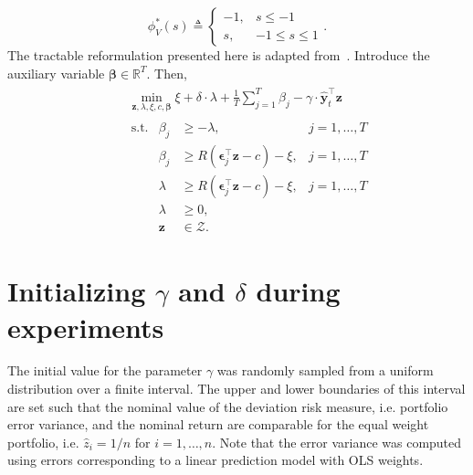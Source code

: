 \documentclass[10pt, twocolumn]{article}
\theoremstyle{plain}
\theoremstyle{definition}
\begin{document}
\begin{appendices}
\[
	\phi_V^*(s) \triangleq \begin{cases}
 							-1,& s\leq -1\\
 							s,& -1\leq s\leq 1 
 							\end{cases}.
\]
The tractable reformulation presented here is adapted from~\citet{ben2013robust}. 
Introduce the auxiliary variable \(\bm{\beta}\in\mathbb{R}^T\). Then, 
\[
\begin{aligned}
	&\begin{aligned}
	&\min_{\bm{z}, \lambda, \xi, c, \bm{\beta}} \xi + \delta\cdot\lambda 
	+ \frac{1}{T} \sum_{j=1}^T \beta_j - \gamma\cdot\hat{\bm{y}}_{t}^\top \bm{z}
	\end{aligned}\\
	&\begin{aligned}
	&\ \text{s.t.} & \beta_j &\geq -\lambda, & j=1,\dots,T\\
	&& \beta_j &\geq R(\bm{\epsilon}_j^\top \bm{z} - c) - \xi, & j=1,\dots,T\\
	&& \lambda &\geq R(\bm{\epsilon}_j^\top \bm{z} - c) - \xi, & j=1,\dots,T\\
	&& \lambda &\geq 0,\\
	&& \bm{z} &\in\mathcal{Z}.
	\end{aligned}	
\end{aligned}
\]


\section{Initializing \texorpdfstring{\(\gamma\)}{Lg} and \texorpdfstring{\(\delta\)}{Lg} during experiments}\label{app:init}

The initial value for the parameter \(\gamma\) was randomly sampled 
from a uniform distribution over a finite interval. The upper and 
lower boundaries of this interval are set such that the nominal 
value of the deviation risk measure, i.e. portfolio error variance,
and the nominal return are comparable for the equal weight portfolio, 
i.e. \(\hat{z}_i = 1/n\) for \(i = 1,\ldots,n\). Note that the error 
variance was computed using errors corresponding to a linear prediction 
model with OLS weights.


\end{appendices}
\end{document}
